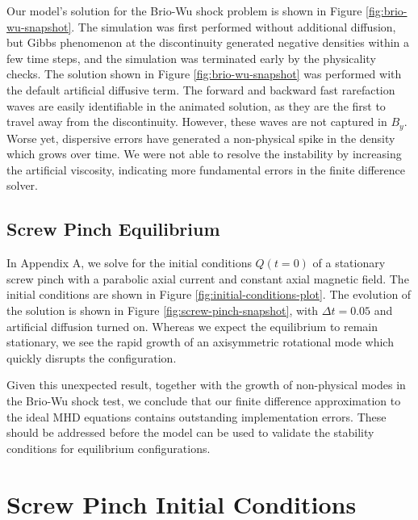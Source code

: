 \documentclass[%
 reprint,
 amsmath,amssymb,
 aps,
]{revtex4-2}
\begin{document}
Our model's solution for the Brio-Wu shock problem is shown in Figure \ref{fig:brio-wu-snapshot}. The simulation was first performed without additional diffusion, but Gibbs phenomenon at the discontinuity generated negative densities within a few time steps, and the simulation was terminated early by the physicality checks. The solution shown in Figure \ref{fig:brio-wu-snapshot} was performed with the default artificial diffusive term. The forward and backward fast rarefaction waves are easily identifiable in the animated solution, as they are the first to travel away from the discontinuity. However, these waves are not captured in $B_y$. Worse yet, dispersive errors have generated a non-physical spike in the density which grows over time. We were not able to resolve the instability by increasing the artificial viscosity, indicating more fundamental errors in the finite difference solver.

\subsection{Screw Pinch Equilibrium}

In Appendix A, we solve for the initial conditions $Q(t=0)$ of a stationary screw pinch with a parabolic axial current and constant axial magnetic field. The initial conditions are shown in Figure \ref{fig:initial-conditions-plot}. The evolution of the solution is shown in Figure \ref{fig:screw-pinch-snapshot}, with $\Delta t=0.05$ and artificial diffusion turned on. Whereas we expect the equilibrium to remain stationary, we see the rapid growth of an axisymmetric rotational mode which quickly disrupts the configuration.

Given this unexpected result, together with the growth of non-physical modes in the Brio-Wu shock test, we conclude that our finite difference approximation to the ideal MHD equations contains outstanding implementation errors. These should be addressed before the model can be used to validate the stability conditions for equilibrium configurations.

\nocite{*}



\onecolumngrid

\pagebreak

\appendix

\section{Screw Pinch Initial Conditions}
\end{document}
